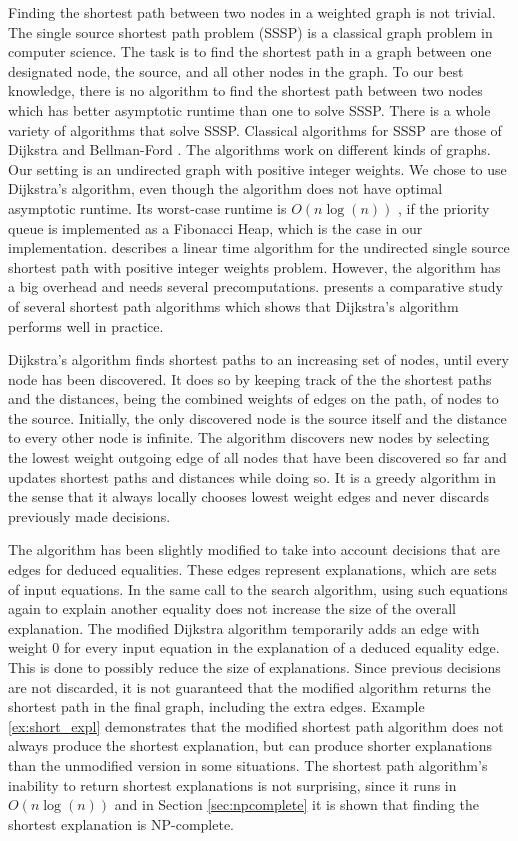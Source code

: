 Finding the shortest path between two nodes in a weighted graph is not trivial.
The single source shortest path problem (SSSP) is a classical graph problem in computer science.
The task is to find the shortest path in a graph between one designated node, the source, and all other nodes in the graph.
To our best knowledge, there is no algorithm to find the shortest path between two nodes which has better asymptotic runtime than one to solve SSSP.
There is a whole variety of algorithms that solve SSSP.
Classical algorithms for SSSP are those of Dijkstra \cite{Dijkstra1959} and Bellman-Ford \cite{Ford1956,Bellman1956}.
The algorithms work on different kinds of graphs.
Our setting is an undirected graph with positive integer weights.
We chose to use Dijkstra's algorithm, even though the algorithm does not have optimal asymptotic runtime.
Its worst-case runtime is $O(n \log(n))$ \cite{Cormen1989}, if the priority queue is implemented as a Fibonacci Heap, which is the case in our implementation.
\cite{Thorup1999} describes a linear time algorithm for the undirected single source shortest path with positive integer weights problem.
However, the algorithm has a big overhead and needs several precomputations.
\cite{Cherkassky1996} presents a comparative study of several shortest path algorithms which shows that Dijkstra's algorithm performs well in practice.

Dijkstra's algorithm finds shortest paths to an increasing set of nodes, until every node has been discovered.
It does so by keeping track of the the shortest paths and the distances, being the combined weights of edges on the path, of nodes to the source.
Initially, the only discovered node is the source itself and the distance to every other node is infinite.
The algorithm discovers new nodes by selecting the lowest weight outgoing edge of all nodes that have been discovered so far and updates shortest paths and distances while doing so.
It is a greedy algorithm in the sense that it always locally chooses lowest weight edges and never discards previously made decisions.

The algorithm has been slightly modified to take into account decisions that are edges for deduced equalities.
These edges represent explanations, which are sets of input equations.
In the same call to the search algorithm, using such equations again to explain another equality does not increase the size of the overall explanation.
The modified Dijkstra algorithm temporarily adds an edge with weight 0 for every input equation in the explanation of a deduced equality edge.
This is done to possibly reduce the size of explanations.
Since previous decisions are not discarded, it is not guaranteed that the modified algorithm returns the shortest path in the final graph, including the extra edges.
Example \ref{ex:short_expl} demonstrates that the modified shortest path algorithm does not always produce the shortest explanation, but can produce shorter explanations than the unmodified version in some situations.
The shortest path algorithm's inability to return shortest explanations is not surprising, since it runs in $O(n \log(n))$ and in Section \ref{sec:npcomplete} it is shown that finding the shortest explanation is NP-complete.


